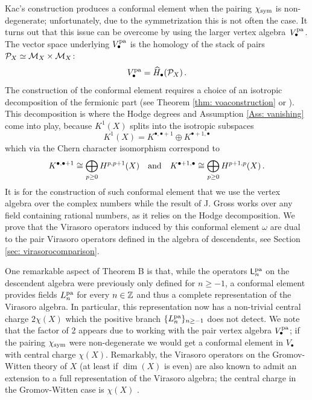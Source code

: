 \documentclass[a4paper, 12pt]{amsart}
\begin{document}
Kac's construction produces a conformal element when the pairing $\chi_{\text{sym}}$ is non-degenerate; unfortunately, due to the symmetrization this is not often the case. It turns out that this issue can be overcome by using the larger vertex algebra~$V_\bullet^{\mathop{\rm pa}\nolimits}$. The vector space underlying $V_\bullet^{\mathop{\rm pa}\nolimits}$ is the homology of the stack of pairs ${\mathcal P}_X\simeq {\mathcal M}_X\times {\mathcal M}_X$:
\[V_\bullet^{\mathop{\rm pa}\nolimits}=\widehat{H}_\bullet({\mathcal P}_X)\,.\]
The construction of the conformal element requires a choice of an isotropic decomposition of the fermionic part (see Theorem \ref{thm: voaconstruction} or \cite[Section 3.6]{Ka98}). This decomposition is where the Hodge degrees and Assumption \ref{Ass: vanishing} come into play, because $K^1(X)$ splits into the isotropic subspaces
$$K^1(X)=K^{\bullet,\bullet+1}\oplus K^{\bullet+1,\bullet}
$$
which via the Chern character isomorphism correspond to 
$$K^{\bullet,\bullet+1}\cong \bigoplus_{p\geq 0}H^{p, p+1}(X)\quad \textup{and}\quad K^{\bullet+1,\bullet}\cong \bigoplus_{p\geq 0}H^{p+1, p}(X)\,.
$$
It is for the construction of such conformal element that we use the vertex algebra over the complex numbers while the result of J. Gross \cite{Gr19} works over any field containing rational numbers, as it relies on the Hodge decomposition. We prove that the Virasoro operators induced by this conformal element $\omega$ are dual to the pair Virasoro operators defined in the algebra of descendents, see Section \ref{sec: virasorocomparison}.


One remarkable aspect of Theorem B is that, while the operators ${\mathsf{L}}_n^{\mathop{\rm pa}\nolimits}$ on the descendent algebra were previously only defined for $n\geq -1$, a conformal element provides fields $L_n^{\mathop{\rm pa}\nolimits}$ for every $n\in {\mathbb{Z}}$ and thus a complete representation of the Virasoro algebra. In particular, this representation now has a non-trivial central charge $2\chi(X)$ which the positive branch $\{L_n^{\mathop{\rm pa}\nolimits}\}_{n\geq -1}$ does not detect. We note that the factor of 2 appears due to working with the pair vertex algebra $V_\bullet^{\mathop{\rm pa}\nolimits}$; if the pairing $\chi_{\text{sym}}$ were non-degenerate we would get a conformal element in $V_\bullet$ with central charge $\chi(X)$. Remarkably, the Virasoro operators on the Gromov-Witten theory of $X$ (at least if $\dim(X)$ is even) are also known to admit an extension to a full representation of the Virasoro algebra; the central charge in the Gromov-Witten case is $\chi(X)$ \cite[Section 2.10]{getzler}. 
\end{document}
